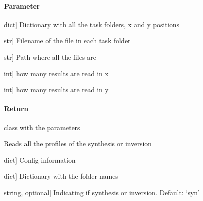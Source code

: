 \documentclass[letterpaper,10pt,english]{sphinxmanual}
\begin{document}
\begin{fulllineitems}
\begin{fulllineitems}
\paragraph{Parameter}
\label{\detokenize{classes:id50}}\begin{description}
\sphinxlineitem{task}{[}dict{]}
\sphinxAtStartPar
Dictionary with all the task folders, x and y positions

\sphinxlineitem{filename}{[}str{]}
\sphinxAtStartPar
Filename of the file in each task folder

\sphinxlineitem{path}{[}str{]}
\sphinxAtStartPar
Path where all the files are

\sphinxlineitem{nx}{[}int{]}
\sphinxAtStartPar
how many results are read in x

\sphinxlineitem{ny}{[}int{]}
\sphinxAtStartPar
how many results are read in y

\end{description}


\paragraph{Return}
\label{\detokenize{classes:id51}}
\sphinxAtStartPar
class with the parameters

\end{fulllineitems}


\begin{fulllineitems}
\label{\detokenize{classes:id52}}
\pysigstartsignatures
{}
\pysigstopsignatures
\sphinxAtStartPar
Reads all the profiles of the synthesis or inversion
\begin{description}
\sphinxlineitem{config}{[}dict{]}
\sphinxAtStartPar
Config information

\sphinxlineitem{tasks}{[}dict{]}
\sphinxAtStartPar
Dictionary with the folder names

\sphinxlineitem{Type}{[}string, optional{]}
\sphinxAtStartPar
Indicating if synthesis or inversion. Default: ‘syn’

\end{description}

\end{fulllineitems}


\end{fulllineitems}
\end{document}
